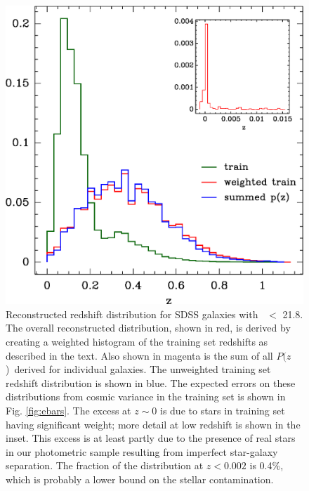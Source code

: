 \documentclass[preprint]{aastex}
\newcommand{\rmax}{21.8}
\newcommand{\pofz}{$P(z$)}
\begin{document}
\begin{figure}[p] \centering
    \includegraphics[scale=0.9]{figures/zweight-10-zhist-withorig-withsum-12.eps}

    \caption{Reconstructed redshift distribution for SDSS galaxies with \rmag\
    $ < $ \rmax.  The overall reconstructed distribution, shown in red, is
    derived by creating a weighted histogram of the training set redshifts as
    described in the text.  Also shown in magenta is the sum of all \pofz\
    derived for individual galaxies.  The unweighted training set redshift
    distribution is shown in blue.  The expected errors on these distributions
    from cosmic variance in the training set is shown in Fig.
    \ref{fig:ebars}. The excess at $z \sim 0$ is due to stars in training set
    having significant weight; more detail at low redshift is shown in the
    inset.  This excess is at least partly due to the presence of real stars in
    our photometric sample resulting from imperfect star-galaxy separation.
    The fraction of the distribution at $z < 0.002$ is 0.4\%, which is probably
    a lower bound on the stellar contamination.  \label{fig:pofz}}

    \vspace{2em}
\end{figure}
\end{document}
